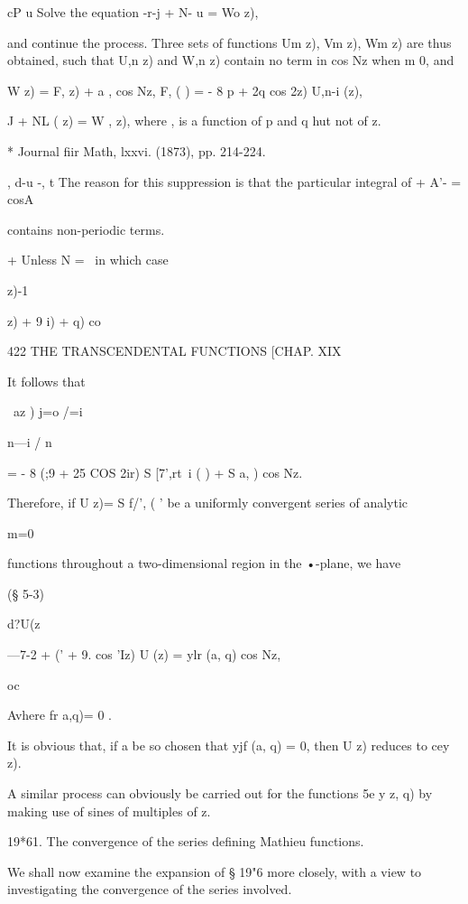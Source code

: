 cP u 
Solve the equation -r-j + N- u = Wo  z), 

and continue the process. Three sets of functions Um z), Vm z), Wm z) 
are thus obtained, such that U,n  z) and W,n  z) contain no term in cos Nz 
when m   0, and 

W   z) = F,   z) + a , cos Nz, F,  ( ) = - 8  p + 2q cos 2z) U,n-i (z), 

 J  + NL ( z) = W , z), 
where  ,  is a function of p and q hut not of z. 

* Journal fiir Math, lxxvi. (1873), pp. 214-224. 

, d-u -, 
t The reason for this suppression is that the particular integral of   + A'-  = cosA  

contains non-periodic terms. 

+ Unless N = \, in which case \ \  \ \  {z)-1\ \ {z) + 9 i) + q) co%



422 THE TRANSCENDENTAL FUNCTIONS [CHAP. XIX 

It follows that 

\ az  )  j=o  /=i 






n—i / n \ 

= - 8 (;9 + 25 COS 2ir) S [7',rt\ i ( ) + S a,  ) cos Nz. 



Therefore, if U z)= S f/',  ( '  be a uniformly convergent series of analytic 

m=0 

functions throughout a two-dimensional region in the  •-plane, we have 

(§ 5-3) 

d?U(z  

—7-2 + ('  +  9. cos 'Iz) U (z) = ylr (a, q) cos Nz, 

oc 

Avhere  fr a,q)=   0 . 

It is obvious that, if a be so chosen that yjf (a, q) = 0, then U  z) reduces 
to cey  z). 

A similar process can obviously be carried out for the functions 5e y  z, q) 
by making use of sines of multiples of z. 

19*61. The convergence of the series defining Mathieu functions. 

We shall now examine the expansion of § 19"6 more closely, with a view to investigating 
the convergence of the series involved. 

}}
